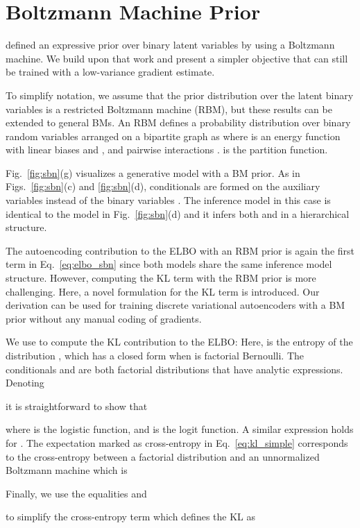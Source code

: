 \documentclass{article}
\begin{document}
\section{Boltzmann Machine Prior} 
\cite{rolfe2016discrete} defined an expressive prior over binary latent variables by using a Boltzmann machine.
We build upon that work and present a simpler objective that can still be trained with a low-variance gradient estimate.

To simplify notation, we assume that the prior distribution over the latent binary variables is a restricted Boltzmann machine (RBM), but these results can be extended to general BMs. An RBM defines a probability distribution over binary random variables arranged on a bipartite graph as  where  is an energy function with linear biases  and , and pairwise interactions .  is the partition function.

Fig.~\ref{fig:sbn}(g) visualizes a generative model with a BM prior.
As in Figs.~\ref{fig:sbn}(c) and \ref{fig:sbn}(d), conditionals are formed on the auxiliary variables  instead of the binary variables . The 
inference model in this case is identical to the model in Fig.~\ref{fig:sbn}(d) and it infers both  and  in a hierarchical structure.

The autoencoding contribution to the ELBO with an RBM prior is again the first term in Eq.~\eqref{eq:elbo_sbn} since both models share the same inference model structure. However, computing the KL term with the RBM prior is more challenging. Here, a novel formulation for the KL term is introduced. Our derivation can be used for training discrete variational autoencoders with a BM prior without any manual coding of gradients.

We use  to compute the KL contribution to the ELBO:
{\small
}
Here,  is the entropy of the distribution , which has a closed form when  is factorial Bernoulli. The conditionals  and  are both
factorial distributions that have analytic expressions. Denoting 

it is straightforward to show that 

where  is the logistic function, and  is the logit function. A similar expression holds for . The expectation marked as cross-entropy in 
Eq.~\eqref{eq:kl_simple} corresponds to the cross-entropy between a factorial distribution and an unnormalized Boltzmann machine which is

Finally, we use the equalities 
 and

to simplify the cross-entropy term which defines the KL as
\end{document}
